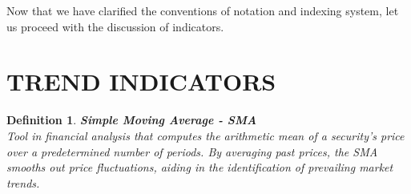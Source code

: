 \documentclass[12pt]{article}
\theoremstyle{plain}
\newtheorem*{definition}{Definition}
\begin{document}
\begin{center}
\end{center}

Now that we have clarified the conventions of notation and indexing system, let us proceed with the discussion of indicators.


\newpage


\section{TREND INDICATORS}

\begin{definition} \textbf{Simple Moving Average - SMA} \\
Tool in financial analysis that computes the arithmetic mean of a security's price over a predetermined number of periods. By averaging past prices, the SMA smooths out price fluctuations, aiding in the identification of prevailing market trends.
\end{definition}
\end{document}
